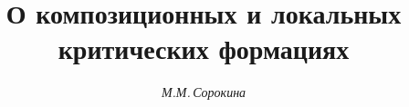 

 


%  


\newcommand{\la}{\langle} 


\newcommand{\ra}{\rangle} 


\newcommand{\form}{\operatorname{form}} 


\newcommand{\cform}{\operatorname{cform}} 


\newcommand{\lform}{\operatorname{lform}} 


\newcommand{\tts}[1]{} 


 




 


\setcounter{page}{59} 












 


\author{\it М.М.\,Сорокина} 




\title{О композиционных и локальных\\


критических формациях} 


 


\date{} 




\pagestyle{plain} %


 





